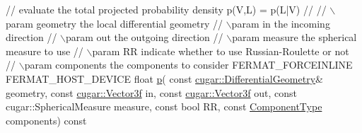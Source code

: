 \begin{DoxyParagraph}{}
\begin{DoxyCode}
   \textcolor{comment}{// evaluate the total projected probability density p(V,L) = p(L|V)}
   \textcolor{comment}{//}
   \textcolor{comment}{// \(\backslash\)param geometry              the local differential geometry}
   \textcolor{comment}{// \(\backslash\)param in                    the incoming direction}
   \textcolor{comment}{// \(\backslash\)param out                   the outgoing direction}
   \textcolor{comment}{// \(\backslash\)param measure               the spherical measure to use}
   \textcolor{comment}{// \(\backslash\)param RR                    indicate whether to use Russian-Roulette or not}
   \textcolor{comment}{// \(\backslash\)param components            the components to consider}
   FERMAT\_FORCEINLINE FERMAT\_HOST\_DEVICE
   \textcolor{keywordtype}{float} \hyperlink{struct_bsdf_a88c3b1f89a3248d4b2684fd402a59ced}{p}(
       \textcolor{keyword}{const} \hyperlink{structcugar_1_1_differential_geometry}{cugar::DifferentialGeometry}&  geometry,
       \textcolor{keyword}{const} \hyperlink{structcugar_1_1_vector}{cugar::Vector3f}               in,
       \textcolor{keyword}{const} \hyperlink{structcugar_1_1_vector}{cugar::Vector3f}               out,
       \textcolor{keyword}{const} cugar::SphericalMeasure       measure,
       \textcolor{keyword}{const} \textcolor{keywordtype}{bool}                          RR,
       \textcolor{keyword}{const} \hyperlink{struct_bsdf_a5f7db6f81220ed9ee6da109d6eb5b585}{ComponentType}                 components) \textcolor{keyword}{const}


\end{DoxyCode}
\end{DoxyParagraph}
